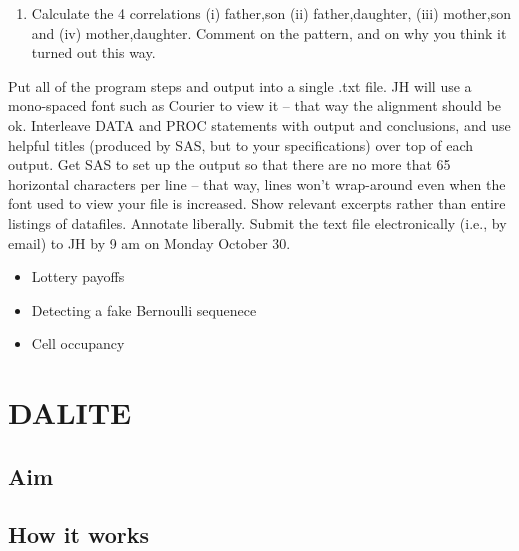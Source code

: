 \documentclass[]{book}
\begin{document}
\begin{enumerate}
\item
  Calculate the 4 correlations (i) father,son (ii) father,daughter, (iii) mother,son and (iv) mother,daughter. Comment on the pattern, and on why you think it turned out this way.
\end{enumerate}

Put all of the program steps and output into a single .txt file. JH will use a mono-spaced font such as Courier to view it -- that way the alignment should be ok. Interleave DATA and PROC statements with output and conclusions, and use helpful titles (produced by SAS, but to your specifications) over top of each output. Get SAS to set up the output so that there are no more that 65 horizontal characters per line -- that way, lines won't wrap-around even when the font used to view your file is increased. Show relevant excerpts rather than entire listings of datafiles. Annotate liberally. Submit the text file electronically (i.e., by email) to JH by 9 am on Monday October 30.

\begin{itemize}
\item
  Lottery payoffs
\item
  Detecting a fake Bernoulli sequenece
\item
  Cell occupancy
\end{itemize}

\hypertarget{dalite}{%
\chapter{DALITE}\label{dalite}}

\hypertarget{aim}{%
\section{Aim}\label{aim}}

\hypertarget{how-it-works}{%
\section{How it works}\label{how-it-works}}


\end{document}
